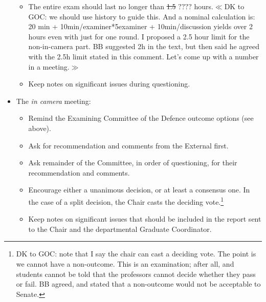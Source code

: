 \documentclass[12pt]{article}
\newcommand{\vote}[1]{\color{voteColor}$\ll$#1$\gg$\color{black}\marginpar[$\gg$ vote]{$\ll$ vote}\index{$>>>>$VOTE$<<<<$}}
\newcommand{\discuss}[1]{\footnote{\color{fixmeColor}#1\color{black}}\index{$>>>>$DISCUSS$<<<<$}}
\newcommand{\GC}{Graduate Coordinator\xspace}
\begin{document}
\begin{itemize}
\begin{itemize}
            \item The entire exam should last no longer than \sout{1.5} $????$ hours.\vote{DK
                to GOC: we should use history to guide this.  And a nominal
                calculation is: 20 min +
                10min/examiner*5examiner + 10min/discussion yields over 2 hours
                even with just for one round.  I proposed a 2.5 hour limit for
                the non-in-camera part. BB suggested 2h in the text, but then
                said he agreed with the 2.5h limit stated in this comment. Let's
                come up with a number in a meeting.}

            \item Keep notes on significant issues during questioning.

        \end{itemize}

    \item The \emph{in camera} meeting:

        \begin{itemize}

            \item Remind the Examining Committee of the Defence outcome options
                (see above).

            \item Ask for recommendation and comments from the External first.

            \item Ask remainder of the Committee, in order of questioning, for
                their recommendation and comments.

            \item Encourage either a unanimous decision, or at least a
                consensus one. In the case of a split decision, the Chair casts
                the deciding vote.\discuss{DK to GOC: note that I say the chair
                can cast a deciding vote. The point is we cannot have a
                non-outcome. This is an examination; after all, and students
                cannot be told that the professors cannot decide whether they
                pass or fail. BB agreed, and stated that a non-outcome would
                not be acceptable to Senate.}

            \item Keep notes on significant issues that should be included in
                the report sent to the Chair and the departmental \GC.

        \end{itemize}


\end{itemize}
\end{document}
